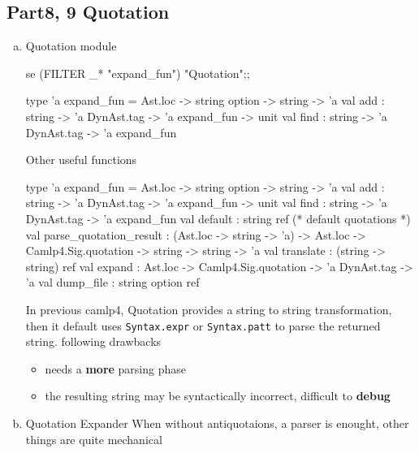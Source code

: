 

















\subsection{Part8, 9 Quotation}
  \begin{enumerate}[(a)]
  \item Quotation module
    \begin{ocamlcode}
      se (FILTER _* "expand_fun") "Quotation";;
    \end{ocamlcode}

    \begin{ocamlcode}
type 'a expand_fun = Ast.loc -> string option -> string -> 'a
val add : string -> 'a DynAst.tag -> 'a expand_fun -> unit
val find : string -> 'a DynAst.tag -> 'a expand_fun      
    \end{ocamlcode}

    Other useful functions 
    \begin{ocamlcode}
type 'a expand_fun = Ast.loc -> string option -> string -> 'a
val add : string -> 'a DynAst.tag -> 'a expand_fun -> unit
val find : string -> 'a DynAst.tag -> 'a expand_fun
val default : string ref  (* default quotations *)
val parse_quotation_result :
      (Ast.loc -> string -> 'a) ->
      Ast.loc -> Camlp4.Sig.quotation -> string -> string -> 'a
val translate : (string -> string) ref
val expand : Ast.loc -> Camlp4.Sig.quotation -> 'a DynAst.tag -> 'a
val dump_file : string option ref
    \end{ocamlcode}

    In previous camlp4, Quotation provides a string to string
    transformation, then it default uses \verb|Syntax.expr| or
    \verb|Syntax.patt| to parse the returned string. following
    drawbacks


    \begin{itemize}
    \item needs a \textbf{more} parsing phase
    \item the resulting string may be syntactically incorrect, difficult
      to \textbf{debug}
    \end{itemize}

\item Quotation Expander 
  When without antiquotaions, a parser is enought, other things are
  quite mechanical


\end{enumerate}
